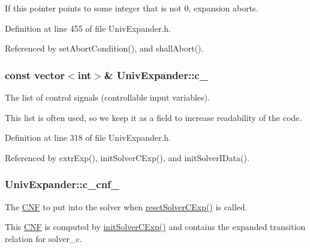 If this pointer points to some integer that is not 0, expansion aborts. 



Definition at line 455 of file Univ\-Expander.\-h.



Referenced by set\-Abort\-Condition(), and shall\-Abort().

\hypertarget{classUnivExpander_a99d032483de0474d8489678c28bb3a64}{
\subsubsection[{c\-\_\-}]{\setlength{\rightskip}{0pt plus 5cm}const vector$<$int$>$\& Univ\-Expander\-::c\-\_\-\hspace{0.3cm}{\ttfamily [protected]}}}\label{classUnivExpander_a99d032483de0474d8489678c28bb3a64}


The list of control signals (controllable input variables). 

This list is often used, so we keep it as a field to increase readability of the code. 

Definition at line 318 of file Univ\-Expander.\-h.



Referenced by extr\-Exp(), init\-Solver\-C\-Exp(), and init\-Solver\-I\-Data().

\hypertarget{classUnivExpander_af58b19991cb7aff5164af51f95ea6557}{
\subsubsection[{c\-\_\-cnf\-\_\-}]{ Univ\-Expander\-::c\-\_\-cnf\-\_\-\hspace{0.3cm}{\ttfamily [protected]}}}\label{classUnivExpander_af58b19991cb7aff5164af51f95ea6557}


The \hyperlink{classCNF}{C\-N\-F} to put into the solver when \hyperlink{classUnivExpander_a27bb05f7f6a31a700d7407c45aebb6e8}{reset\-Solver\-C\-Exp()} is called. 

This \hyperlink{classCNF}{C\-N\-F} is computed by \hyperlink{classUnivExpander_a909bf44bb238afe91f4bf20416491771}{init\-Solver\-C\-Exp()} and contains the expanded transition relation for solver\-\_\-c. 

